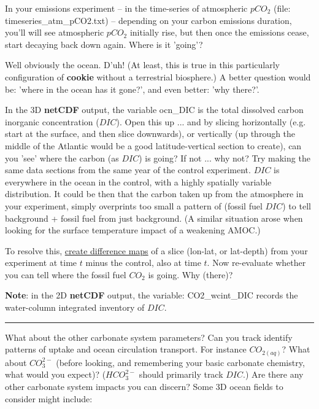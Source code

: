 In your emissions experiment -- in the time-series of atmospheric \(pCO_{2}\) (file: \textsf{\footnotesize timeseries\_atm\_pCO2.txt}) -- depending on your carbon emissions duration, you'll will see atmospheric \(pCO_{2}\) initially rise, but then once the emissions cease, start decaying back down again. Where is it 'going'?

Well obviously the ocean. D'uh! (At least, this is true in this particularly configuration of \textbf{cookie} without a terrestrial biosphere.) A better question would be: 'where in the ocean has it gone?', and even better: 'why there?'.

In the 3D \textbf{netCDF} output, the variable \textsf{\footnotesize ocn\_DIC} is the total dissolved carbon inorganic concentration (\(DIC\)). Open this up ... and by slicing horizontally (e.g. start at the surface, and then slice downwards), or vertically (up through the middle of the Atlantic would be a good latitude-vertical section to create), can you 'see' where the carbon (as \(DIC\)) is going? If not ... why not? Try making the same data sections from the same year of the control experiment. \(DIC\) is everywhere in the ocean in the control, with a highly spatially variable distribution. It could be then that the carbon taken up from the atmosphere in your experiment, simply overprints too small a pattern of (fossil fuel \(DIC\)) to tell background + fossil fuel from just background. (A similar situation arose when looking for the surface temperature impact of a weakening AMOC.)

To resolve this, \uline{create difference maps} of a slice (lon-lat, or lat-depth) from your experiment at time \(t\) minus the control, also at time \(t\). Now re-evaluate whether you can tell where the fossil fuel \(CO_{2}\) is going. Why (there)?

\vspace{1mm}
\textbf{Note}: in the 2D \textbf{netCDF} output, the variable:  \textsf{\footnotesize CO2\_wcint\_DIC} records the water-column integrated inventory of $DIC$.

\vspace{1mm} \noindent\rule{4cm}{0.1mm} \vspace{2mm}

\newpage

\noindent What about the other carbonate system parameters? Can you track identify patterns of uptake and ocean circulation transport. For instance \(CO_{2(aq)}\)? What about \(CO^{2-}_{3}\) (before looking, and remembering your basic carbonate chemistry, what would you expect)? (\(HCO^{2-}_{3}\) should primarily track \(DIC\).) Are there any other carbonate system impacts you can discern? Some 3D ocean fields to consider might include:

